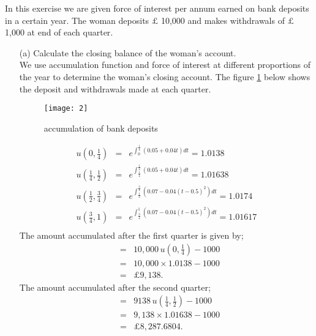 \documentclass[12pt,a4paper]{article}
\begin{document}
In this exercise we are given force of interest per annum earned on bank deposits in a certain year. The woman deposits $\pounds$ 10,000 and makes withdrawals of $\pounds$ 1,000 at end of each quarter.
\begin{enumerate}
\item[(a)]
Calculate the closing balance of the woman's account.\\
We use accumulation function and force of interest at different proportions of the year to determine the woman's closing account. The figure \ref{fig 1} below shows the deposit and withdrawals made at each quarter.
\begin{figure}[H]
\texttt{[image: 2]}
\centering
\caption{accumulation of bank deposits}
\label{fig 1}
\end{figure}
\begin{eqnarray*}
u\left(0,\frac{1}{4} \right)&=& e^{\int_0 ^{\frac{1}{4}}(0.05+0.04t)dt}=1.0138\\
u\left(\frac{1}{4},\frac{1}{2} \right)&=& e^{\int_{\frac{1}{4}} ^{\frac{1}{2}}(0.05+0.04t)dt}=1.01638\\
u\left(\frac{1}{2},\frac{3}{4} \right)&=& e^{\int_{\frac{1}{2}} ^{\frac{3}{4}}(0.07-0.04(t-0.5)^2 )dt}=1.0174\\
u\left(\frac{3}{4},1 \right)&=& e^{\int_{\frac{3}{4}} ^1 (0.07-0.04(t-0.5)^2 )dt}=1.01617\\
\end{eqnarray*}
The amount accumulated after the first quarter is given by;
\begin{eqnarray*}
&=&10,000 \,u\left(0,\frac{1}{4} \right)-1000\\
&=&10,000 \times 1.0138-1000\\
&=& \pounds 9,138.
\end{eqnarray*}
The amount accumulated after the second quarter;
\begin{eqnarray*}
&=& 9138 \,u\left(\frac{1}{4},\frac{1}{2} \right)-1000\\
&=&9,138 \times 1.01638-1000\\
&=& \pounds 8,287.6804.
\end{eqnarray*}


\end{enumerate}
\end{document}
